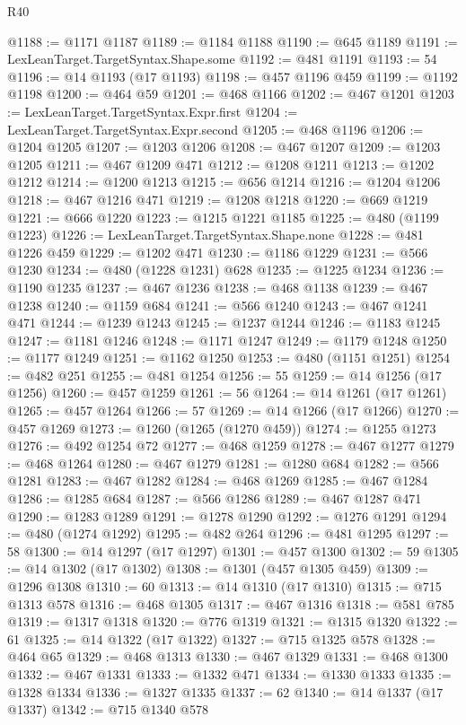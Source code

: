 \begin{lexlean}{R40}
\begin{coremodule}
{{{{{{{{{{{{{{{{{{{{{{{{{{{{{{{{{{{{{{{{{{{{{{{{{{{{{{{{{{{{{{{{{{{{{{{{{{{{{{{{{{{{{{{{{{{{{{{{{{{{{{{{{{{{{@1188 := @1171 @1187
@1189 := @1184 @1188
@1190 := @645 @1189
@1191 := LexLeanTarget.TargetSyntax.Shape.some
@1192 := @481 @1191
@1193 := 54
@1196 := @14 @1193 (@17 @1193)
@1198 := @457 @1196 @459
@1199 := @1192 @1198
@1200 := @464 @59
@1201 := @468 @1166
@1202 := @467 @1201
@1203 := LexLeanTarget.TargetSyntax.Expr.first
@1204 := LexLeanTarget.TargetSyntax.Expr.second
@1205 := @468 @1196
@1206 := @1204 @1205
@1207 := @1203 @1206
@1208 := @467 @1207
@1209 := @1203 @1205
@1211 := @467 @1209 @471
@1212 := @1208 @1211
@1213 := @1202 @1212
@1214 := @1200 @1213
@1215 := @656 @1214
@1216 := @1204 @1206
@1218 := @467 @1216 @471
@1219 := @1208 @1218
@1220 := @669 @1219
@1221 := @666 @1220
@1223 := @1215 @1221 @1185
@1225 := @480 (@1199 @1223)
@1226 := LexLeanTarget.TargetSyntax.Shape.none
@1228 := @481 @1226 @459
@1229 := @1202 @471
@1230 := @1186 @1229
@1231 := @566 @1230
@1234 := @480 (@1228 @1231) @628
@1235 := @1225 @1234
@1236 := @1190 @1235
@1237 := @467 @1236
@1238 := @468 @1138
@1239 := @467 @1238
@1240 := @1159 @684
@1241 := @566 @1240
@1243 := @467 @1241 @471
@1244 := @1239 @1243
@1245 := @1237 @1244
@1246 := @1183 @1245
@1247 := @1181 @1246
@1248 := @1171 @1247
@1249 := @1179 @1248
@1250 := @1177 @1249
@1251 := @1162 @1250
@1253 := @480 (@1151 @1251)
@1254 := @482 @251
@1255 := @481 @1254
@1256 := 55
@1259 := @14 @1256 (@17 @1256)
@1260 := @457 @1259
@1261 := 56
@1264 := @14 @1261 (@17 @1261)
@1265 := @457 @1264
@1266 := 57
@1269 := @14 @1266 (@17 @1266)
@1270 := @457 @1269
@1273 := @1260 (@1265 (@1270 @459))
@1274 := @1255 @1273
@1276 := @492 @1254 @72
@1277 := @468 @1259
@1278 := @467 @1277
@1279 := @468 @1264
@1280 := @467 @1279
@1281 := @1280 @684
@1282 := @566 @1281
@1283 := @467 @1282
@1284 := @468 @1269
@1285 := @467 @1284
@1286 := @1285 @684
@1287 := @566 @1286
@1289 := @467 @1287 @471
@1290 := @1283 @1289
@1291 := @1278 @1290
@1292 := @1276 @1291
@1294 := @480 (@1274 @1292)
@1295 := @482 @264
@1296 := @481 @1295
@1297 := 58
@1300 := @14 @1297 (@17 @1297)
@1301 := @457 @1300
@1302 := 59
@1305 := @14 @1302 (@17 @1302)
@1308 := @1301 (@457 @1305 @459)
@1309 := @1296 @1308
@1310 := 60
@1313 := @14 @1310 (@17 @1310)
@1315 := @715 @1313 @578
@1316 := @468 @1305
@1317 := @467 @1316
@1318 := @581 @785
@1319 := @1317 @1318
@1320 := @776 @1319
@1321 := @1315 @1320
@1322 := 61
@1325 := @14 @1322 (@17 @1322)
@1327 := @715 @1325 @578
@1328 := @464 @65
@1329 := @468 @1313
@1330 := @467 @1329
@1331 := @468 @1300
@1332 := @467 @1331
@1333 := @1332 @471
@1334 := @1330 @1333
@1335 := @1328 @1334
@1336 := @1327 @1335
@1337 := 62
@1340 := @14 @1337 (@17 @1337)
@1342 := @715 @1340 @578
}}}}}}}}}}}}}}}}}}}}}}}}}}}}}}}}}}}}}}}}}}}}}}}}}}}}}}}}}}}}}}}}}}}}}}}}}}}}}}}}}}}}}}}}}}}}}}}}}}}}}}}}}}}}}
\end{coremodule}
\end{lexlean}
